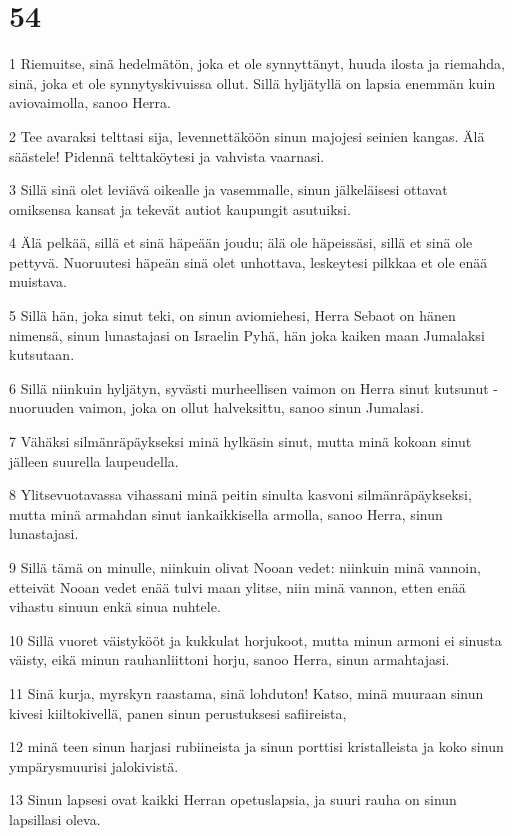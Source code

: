 \chapter{54}

\par 1 Riemuitse, sinä hedelmätön, joka et ole synnyttänyt, huuda ilosta ja riemahda, sinä, joka et ole synnytyskivuissa ollut. Sillä hyljätyllä on lapsia enemmän kuin aviovaimolla, sanoo Herra.
\par 2 Tee avaraksi telttasi sija, levennettäköön sinun majojesi seinien kangas. Älä säästele! Pidennä telttaköytesi ja vahvista vaarnasi.
\par 3 Sillä sinä olet leviävä oikealle ja vasemmalle, sinun jälkeläisesi ottavat omiksensa kansat ja tekevät autiot kaupungit asutuiksi.
\par 4 Älä pelkää, sillä et sinä häpeään joudu; älä ole häpeissäsi, sillä et sinä ole pettyvä. Nuoruutesi häpeän sinä olet unhottava, leskeytesi pilkkaa et ole enää muistava.
\par 5 Sillä hän, joka sinut teki, on sinun aviomiehesi, Herra Sebaot on hänen nimensä, sinun lunastajasi on Israelin Pyhä, hän joka kaiken maan Jumalaksi kutsutaan.
\par 6 Sillä niinkuin hyljätyn, syvästi murheellisen vaimon on Herra sinut kutsunut - nuoruuden vaimon, joka on ollut halveksittu, sanoo sinun Jumalasi.
\par 7 Vähäksi silmänräpäykseksi minä hylkäsin sinut, mutta minä kokoan sinut jälleen suurella laupeudella.
\par 8 Ylitsevuotavassa vihassani minä peitin sinulta kasvoni silmänräpäykseksi, mutta minä armahdan sinut iankaikkisella armolla, sanoo Herra, sinun lunastajasi.
\par 9 Sillä tämä on minulle, niinkuin olivat Nooan vedet: niinkuin minä vannoin, etteivät Nooan vedet enää tulvi maan ylitse, niin minä vannon, etten enää vihastu sinuun enkä sinua nuhtele.
\par 10 Sillä vuoret väistykööt ja kukkulat horjukoot, mutta minun armoni ei sinusta väisty, eikä minun rauhanliittoni horju, sanoo Herra, sinun armahtajasi.
\par 11 Sinä kurja, myrskyn raastama, sinä lohduton! Katso, minä muuraan sinun kivesi kiiltokivellä, panen sinun perustuksesi safiireista,
\par 12 minä teen sinun harjasi rubiineista ja sinun porttisi kristalleista ja koko sinun ympärysmuurisi jalokivistä.
\par 13 Sinun lapsesi ovat kaikki Herran opetuslapsia, ja suuri rauha on sinun lapsillasi oleva.
